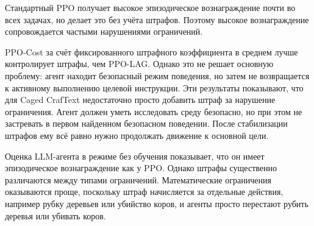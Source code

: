 \begin{table}[ht]
\centering
\caption{Сравнение базовых алгоритмов и LLM-агента на Caged CrafText. R~--- вознаграждение, C~--- штраф за нарушение ограничений.}
\label{tab:synopsis_caged_results}
\tiny
\setlength{\tabcolsep}{1.5pt}
\renewcommand{\arraystretch}{1.0}
\end{table}

Стандартный PPO получает высокое эпизодическое вознаграждение почти во всех задачах, но делает это без учёта штрафов. Поэтому высокое вознаграждение сопровождается частыми нарушениями ограничений.

PPO-Cost за счёт фиксированного штрафного коэффициента в среднем лучше контролирует штрафы, чем PPO-LAG. Однако это не решает основную проблему: агент находит безопасный режим поведения, но затем не возвращается к активному выполнению целевой инструкции. Эти результаты показывают, что для Caged CrafText недостаточно просто добавить штраф за нарушение ограничения. Агент должен уметь исследовать среду безопасно, но при этом не застревать в первом найденном безопасном поведении. После стабилизации штрафов ему всё равно нужно продолжать движение к основной цели.

Оценка LLM-агента в режиме без обучения показывает, что он имеет эпизодическое вознаграждение как у PPO. Однако штрафы существенно различаются между типами ограничений. Математические ограничения оказываются проще, поскольку штраф начисляется за отдельные действия, например рубку деревьев или убийство коров, и агенты просто перестают рубить деревья или убивать коров.

